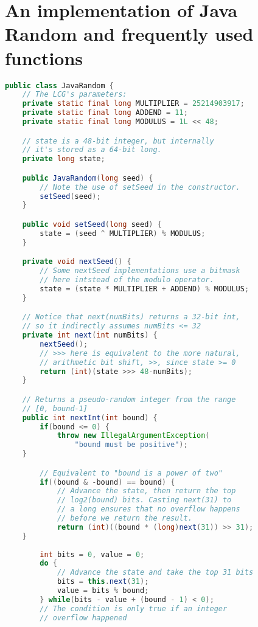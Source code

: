 \documentclass{article}
\begin{document}
\appendix

\section{An implementation of Java Random and frequently used functions}\label{appendix.jrand}

\begin{lstlisting}[language=Java]
public class JavaRandom {
    // The LCG's parameters:
    private static final long MULTIPLIER = 25214903917;
    private static final long ADDEND = 11;
    private static final long MODULUS = 1L << 48;

    // state is a 48-bit integer, but internally
    // it's stored as a 64-bit long.
    private long state;

    public JavaRandom(long seed) {
        // Note the use of setSeed in the constructor.
        setSeed(seed);
    }

    public void setSeed(long seed) {
        state = (seed ^ MULTIPLIER) % MODULUS;
    }

    private void nextSeed() {
        // Some nextSeed implementations use a bitmask
        // here intstead of the modulo operator.
        state = (state * MULTIPLIER + ADDEND) % MODULUS;
    }

    // Notice that next(numBits) returns a 32-bit int, 
    // so it indirectly assumes numBits <= 32
    private int next(int numBits) {
        nextSeed();
        // >>> here is equivalent to the more natural,
        // arithmetic bit shift, >>, since state >= 0
        return (int)(state >>> 48-numBits);
    }

    // Returns a pseudo-random integer from the range
    // [0, bound-1]
    public int nextInt(int bound) {
        if(bound <= 0) {
            throw new IllegalArgumentException(
                "bound must be positive");
	}

        // Equivalent to "bound is a power of two"
        if((bound & -bound) == bound) {
            // Advance the state, then return the top 
            // log2(bound) bits. Casting next(31) to 
            // a long ensures that no overflow happens 
            // before we return the result.
            return (int)((bound * (long)next(31)) >> 31);
	}
 
        int bits = 0, value = 0;
        do {
            // Advance the state and take the top 31 bits
            bits = this.next(31);
            value = bits % bound;
        } while(bits - value + (bound - 1) < 0);
        // The condition is only true if an integer 
        // overflow happened
        

\end{lstlisting}
\end{document}
